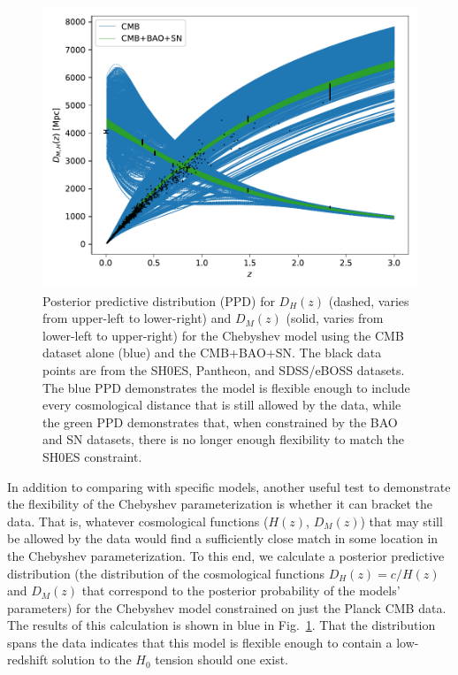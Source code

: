 \documentclass[
 reprint,
 amsmath,amssymb,
 aps,
]{revtex4-2}
\begin{document}
\begin{figure}
    \centering
    \includegraphics[width=\columnwidth]{cheb_combo_dists_check.pdf}
    \caption{Posterior predictive distribution (PPD) for $D_H(z)$ (dashed, varies from upper-left to lower-right) and $D_M(z)$ (solid, varies from lower-left to upper-right) for the Chebyshev model using the CMB dataset alone (blue) and the CMB+BAO+SN. The black data points are from the SH0ES, Pantheon, and SDSS/eBOSS datasets. The blue PPD demonstrates the model is flexible enough to include every cosmological distance that is still allowed by the data, while the green PPD demonstrates that, when constrained by the BAO and SN datasets, there is no longer enough flexibility to match the SH0ES constraint.}
    \label{fig:prior}
\end{figure}

In addition to comparing with specific models, another useful test to demonstrate the flexibility of the Chebyshev parameterization is whether it can bracket the data.  That is, whatever cosmological functions ($H(z)$, $D_M(z)$) that may still be allowed by the data would find a sufficiently close match in some location in the Chebyshev parameterization.  To this end, we calculate a posterior predictive distribution (the distribution of the cosmological functions $D_H(z) = c/H(z)$ and $D_M(z)$ that correspond to the posterior probability of the models' parameters) for the Chebyshev model constrained on just the Planck CMB data. The results of this calculation is shown in blue in Fig.~\ref{fig:prior}.  That the distribution spans the data indicates that this model is flexible enough to contain a low-redshift solution to the $H_0$ tension should one exist. 
\end{document}
